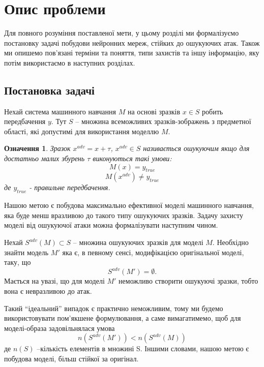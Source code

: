 \documentclass[14pt,a4paper]{extarticle}
\newcounter{e}
\newtheorem{defn}[theorem]{Означення}
\numberwithin{equation}{section}
\numberwithin{figure}{section}
\begin{document}
 
 \newpage
 \thispagestyle{empty}
 \section{Опис проблеми}
 
 Для повного розуміння поставленої мети, у цьому розділі ми формалізуємо постановку задачі побудови нейронних мереж, стійких до ошукуючих атак. Також ми опишемо пов'язані терміни та поняття, типи захистів та іншу інформацію, яку потім використаємо в наступних розділах.
 
 \subsection{Постановка задачі}
 
 Нехай система машинного навчання $M$ на основі зразків $x \in S$ робить передбачення $y$. Тут $S$ -- множина всеможливих зразків-зображень з предметної області, які допустимі для використання моделлю $M$.
 
 \begin{defn}
 	Зразок $x^{adv} = x + \tau$, $x^{adv} \in S$ називається ошукуючим якщо для достатньо малих збурень $\tau$ виконуються такі умови:  
 	\begin{equation}
	 	M(x) = y_{true}
	\end{equation}
	\begin{equation}
	 	M(x^{adv}) \neq y_{true}
 	\end{equation}
 	де $y_{true}$ - правильне передбачення. 
 \end{defn}
 
 Нашою метою є побудова максимально ефективної моделі машинного навчання, яка буде менш вразливою до такого типу ошукуючих зразків. Задачу захисту моделі від ошукуючої атаки можна формалізувати наступним чином.
 
 Нехай $S^{adv}(M) \subset S$ -- множина ошукуючих зразків для моделі $M$. Необхідно знайти модель $M'$ яка є, в певному сенсі, модифікацією оригінальної моделі, таку, що
 \begin{equation}
 	S^{adv}(M') = \emptyset.
 \end{equation}
 Мається на увазі, що для моделі $M'$ неможливо створити ошукуючі зразки, тобто вона є невразливою до атак. 

 Такий ``ідеальний'' випадок є практично неможливим, тому ми будемо використовувати пом'якшене формулювання, а саме вимагатимемо, щоб для моделі-образа задовільнялася умова
 \begin{equation}
 	n(S^{adv}(M')) < n(S^{adv}(M))
 \end{equation}
 де $n(S)$ --кількість елементів в множині S. Іншими словами, нашою метою є побудова моделі, більш стійкої за оригінал.
 
\end{document}
